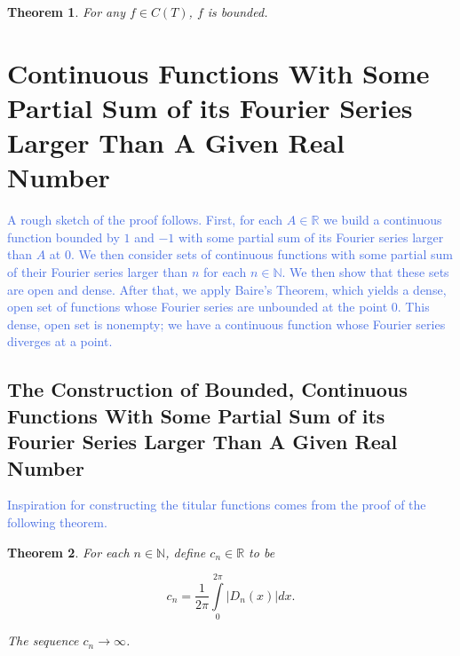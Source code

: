 \documentclass{amsart}
\newcommand{\N}{\mathbb{N}}
\newcommand{\R}{\mathbb{R}}
\newcommand{\colorcomment}[2]{\textcolor{#1}{#2}} %
\newcommand{\absval}[1]{\lvert #1 \rvert}
\newtheorem{thm}{Theorem}[section]
\theoremstyle{definition}
\begin{document}
\begin{thm}
For any $f \in C(T)$, $f$ is bounded.
\end{thm}

\section{Continuous Functions With Some Partial Sum of its Fourier Series Larger Than A Given Real Number}

\colorcomment{RoyalBlue}{A rough sketch of the proof follows. 
First, for each $A \in \R$ we build a continuous function bounded by $1$ and $-1$ with some partial sum of its Fourier series larger than $A$ at $0$. 
We then consider sets of continuous functions with some partial sum of their Fourier series larger than $n$ for each $n \in \N$.
We then show that these sets are open and dense. 
After that, we apply Baire's Theorem, which yields a dense, open set of functions whose Fourier series are unbounded at the point $0$. 
This dense, open set is nonempty; we have a continuous function whose Fourier series diverges at a point.}

\subsection{The Construction of Bounded, Continuous Functions With Some Partial Sum of its Fourier Series Larger Than A Given Real Number}

\colorcomment{RoyalBlue}{Inspiration for constructing the titular functions comes from the proof of the following theorem.}

\begin{thm}
For each $n \in \N$, define $c_n \in \R$ to be

\begin{displaymath}
c_n = \frac{1}{2 \pi} \int\limits_0^{2\pi} \absval{D_n(x)} dx.
\end{displaymath}

The sequence $c_n \to \infty$.
\end{thm}
\end{document}
